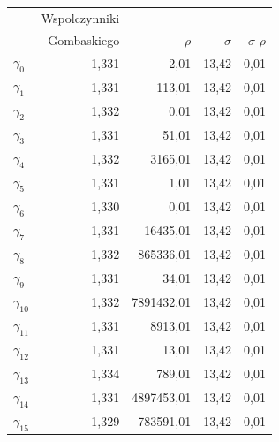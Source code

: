 \documentclass{my_pracamgr}
\begin{document}
\begin{center}
  \begin{tabular}{lrrrr}
    & Wspolczynniki \\
    & Gombaskiego & $\rho$ & $\sigma$ & $\sigma$-$\rho$\\
    $\gamma_{0}$ & 1,331 & 2,01 & 13,42 & 0,01 \\
    $\gamma_{1}$ & 1,331 & 113,01 & 13,42 & 0,01 \\
    $\gamma_{2}$ & 1,332 & 0,01 & 13,42 & 0,01 \\
    $\gamma_{3}$ & 1,331 & 51,01 & 13,42 & 0,01 \\
    $\gamma_{4}$ & 1,332 & 3165,01 & 13,42 & 0,01 \\
    $\gamma_{5}$ & 1,331 & 1,01 & 13,42 & 0,01 \\
    $\gamma_{6}$ & 1,330 & 0,01 & 13,42 & 0,01 \\
    $\gamma_{7}$ & 1,331 & 16435,01 & 13,42 & 0,01 \\
    $\gamma_{8}$ & 1,332 & 865336,01 & 13,42 & 0,01 \\
    $\gamma_{9}$ & 1,331 & 34,01 & 13,42 & 0,01 \\
    $\gamma_{10}$ & 1,332 & 7891432,01 & 13,42 & 0,01 \\
    $\gamma_{11}$ & 1,331 & 8913,01 & 13,42 & 0,01 \\
    $\gamma_{12}$ & 1,331 & 13,01 & 13,42 & 0,01 \\
    $\gamma_{13}$ & 1,334 & 789,01 & 13,42 & 0,01 \\
    $\gamma_{14}$ & 1,331 & 4897453,01 & 13,42 & 0,01 \\
    $\gamma_{15}$ & 1,329 & 783591,01 & 13,42 & 0,01 \\
  \end{tabular}
\end{center}
\end{document}
